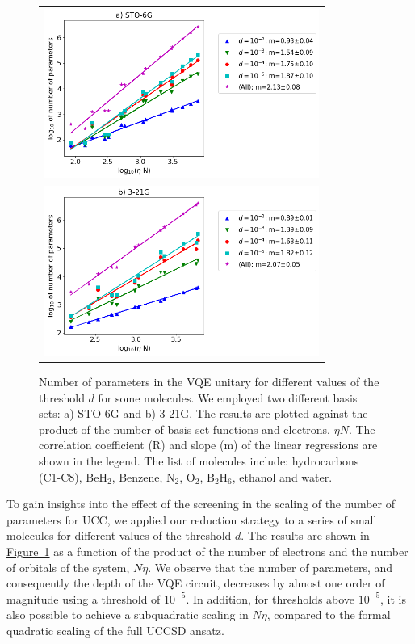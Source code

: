 \documentclass[superscriptaddress,aps,pra,twocolumn,nofootinbib,babel]{revtex4-1}
\newcommand{\fig}[1]{\hyperref[fig:#1]{Figure~\ref*{fig:#1}}}
\begin{document}
\begin{figure}
\centering
\begin{tabular}{c}  \includegraphics[width=9cm]{figures/screening-sto6g.png} \\ \includegraphics[width=9cm]{figures/screening-321g.png} 
\end{tabular}
\caption{Number of parameters in the VQE unitary for different values of the threshold $d$ for some molecules. We employed two different basis sets: a) STO-6G and b) 3-21G. The results are plotted against the product of the number of basis set functions and electrons, $\eta N$. The correlation coefficient (R) and slope (m) of the linear regressions are shown in the legend. The list of molecules include: hydrocarbons (C1-C8), BeH$_2$, Benzene, N$_2$, O$_2$, B$_2$H$_6$, ethanol and water.}\label{fig:mp2screeningmol}
\end{figure}

To gain insights into the effect of the screening in the scaling of the number of parameters for UCC, we applied our reduction strategy to a series of small molecules for different values of the threshold $d$. The results are shown in \fig{mp2screeningmol} as a function of the product of the number of electrons and the number of orbitals of the system, $N\eta$. We observe that the number of parameters, and consequently the depth of the VQE circuit, decreases by almost one order of magnitude using a threshold of $10^{-5}$. In addition, for thresholds above $10^{-5}$, it is also possible to achieve a subquadratic scaling in $N\eta$, compared to the formal quadratic scaling of the full UCCSD ansatz.
\end{document}

